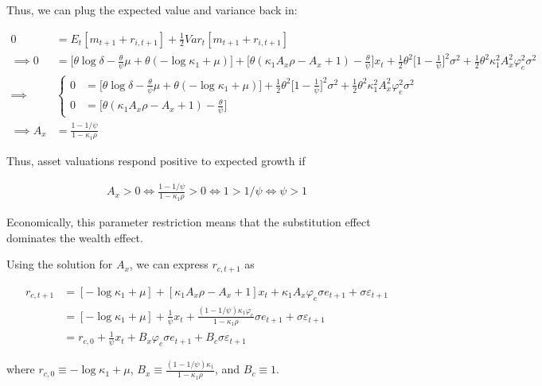\documentclass{article}
\begin{document}
\begin{enumerate}
Thus, we can plug the expected value and variance back in:

\begin{align*}
0&= E_t[m_{t+1} + r_{i,t+1}] + \frac{1}{2} Var_t[m_{t+1} + r_{i,t+1}]\\
\implies
0 &= \Bigg[\theta \log \delta 
- \frac{\theta}{\psi} \mu 
+  \theta (-\log \kappa_1 + \mu) \Bigg]
+  \Bigg[\theta(\kappa_1 A_x \rho - A_x + 1) - \frac{\theta}{\psi}\Bigg] x_t 
+ \frac{1}{2} \theta^2 \Bigg[1 - \frac{1}{\psi}  \Bigg]^2\sigma^2 
+ \frac{1}{2} \theta^2 \kappa_1^2 A_x^2 \varphi_e^2 \sigma^2 \\
\implies &
\begin{cases}
0 &=\Bigg[\theta \log \delta 
- \frac{\theta}{\psi} \mu 
+  \theta (-\log \kappa_1 + \mu) \Bigg]
+ \frac{1}{2} \theta^2 \Bigg[1 - \frac{1}{\psi}  \Bigg]^2\sigma^2 
+ \frac{1}{2} \theta^2 \kappa_1^2 A_x^2 \varphi_e^2 \sigma^2 \\
0 &=  \Bigg[\theta(\kappa_1 A_x \rho - A_x + 1) - \frac{\theta}{\psi}\Bigg]
\end{cases}\\
\implies
A_x &= \frac{1 - 1/\psi}{1 - \kappa_1 \rho}
\end{align*}


Thus, asset valuations respond positive to expected growth if 

\begin{align*}
A_x > 0
\iff 
\frac{1 - 1/\psi}{1 - \kappa_1 \rho} > 0 
\iff
1 > 1/\psi 
\iff
\psi > 1
\end{align*}

Economically, this parameter restriction means that the substitution effect dominates the wealth effect.

Using the solution for $A_x$, we can express $r_{c,t+1}$ as 

\begin{align*}
r_{c,t+1} &= [-\log \kappa_1 + \mu] +  [\kappa_1 A_x \rho - A_x + 1] x_t  + \kappa_1 A_x \varphi_e \sigma e_{t+1} + \sigma \varepsilon_{t+1}\\
&= [-\log \kappa_1 + \mu] +  \frac{1}{\psi} x_t  + \frac{(1-1/\psi)\kappa_1 \varphi_e }{1- \kappa_1 \rho} \sigma e_{t+1} + \sigma \varepsilon_{t+1}\\
&= r_{c,0} +  \frac{1}{\psi} x_t  + B_x \varphi_e\sigma e_{t+1} + B_c \sigma \varepsilon_{t+1}
\end{align*}

where $r_{c,0} \equiv -\log \kappa_1 + \mu$, $B_x \equiv \frac{(1-1/\psi)\kappa_1 }{1- \kappa_1 \rho}$, and $B_c \equiv 1$.


\end{enumerate}
\end{document}
